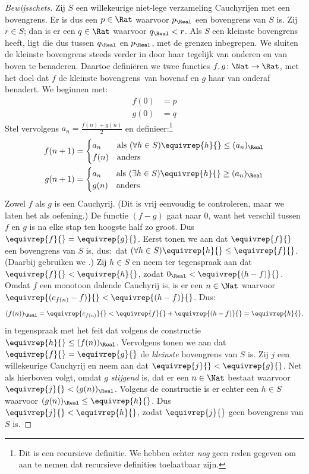 \documentclass[../../../include/open-logic-section]{subfiles}
\begin{document}
\begin{proof}[Bewijsschets] Zij $S$ een willekeurige niet-lege
verzameling Cauchyrijen met een bovengrens. Er is dus een $p \in \Rat$
waarvoor $p_{\Real}$ een bovengrens van $S$ is. Zij $r \in S$; dan is er
een $q \in \Rat$ waarvoor $q_{\Real} < r$. Als $S$ een kleinste
bovengrens heeft, ligt die dus tussen $q_\Real$ en $p_\Real$, met de
grenzen inbegrepen.
We sluiten de kleinste bovengrens steeds verder in door haar tegelijk
van onderen en van boven te benaderen. Daartoe definiëren we twee
functies $f, g \colon \Nat \to \Rat$, met het doel dat $f$ de kleinste
bovengrens\ van bovenaf en $g$ haar van onderaf benadert. We beginnen
met:
\begin{align*}
	f(0) &= p \\
	g(0) &= q
\end{align*}
Stel vervolgens $a_n = \frac{f(n) + g(n)}{2}$ en
definieer:\footnote{Dit is een recursieve definitie. We hebben echter
\emph{nog} geen reden gegeven om aan te nemen dat recursieve definities
toelaatbaar zijn.}
\begin{align*}
	f(n+1) &=
	\begin{cases}
		a_n &\text{als }(\forall h \in S)\equivrep{h}{} \leq (a_n)_\Real\\
		f(n)&\text{anders}
	\end{cases}\\
	g(n+1) &=
	\begin{cases}
		a_n &\text{als }(\exists h \in S)\equivrep{h}{} \geq (a_n)_\Real\\
	 	g(n) &\text{anders}
	\end{cases}
\end{align*}
Zowel $f$ als $g$ is een Cauchyrij. (Dit is vrij eenvoudig te
controleren, maar we laten het als oefening.) De functie $(f-g)$ gaat
naar $0$, want het verschil tussen $f$ en $g$ is na elke stap ten
hoogste half zo groot. Dus $\equivrep{f}{} = \equivrep{g}{}$.
Eerst tonen we aan dat $\equivrep{f}{}$ een bovengrens van $S$ is,
dus:\ dat $(\forall h \in S)\equivrep{h}{} \leq \equivrep{f}{}$. (Daarbij
gebruiken we .) Zij $h \in S$ en neem ter
tegenspraak aan dat $\equivrep{f}{} < \equivrep{h}{}$, zodat $0_\Real <
\equivrep{(h-f)}{}$. Omdat $f$ een monotoon dalende Cauchyrij is, is er
een $n \in \Nat$ waarvoor $\equivrep{(c_{f(n)} - f)}{} <
\equivrep{(h-f)}{}$. Dus:
\[
	(f(n))_\Real = \equivrep{c_{f(n)}}{} < \equivrep{f}{} + \equivrep{(h-f)}{} = \equivrep{h}{},
\]
in tegenspraak met het feit dat volgens de constructie
$\equivrep{h}{} \leq (f(n))_\Real$.
Vervolgens tonen we aan dat $\equivrep{f}{} = \equivrep{g}{}$ de
\emph{kleinste} bovengrens van $S$ is. Zij $j$ een willekeurige
Cauchyrij en neem aan dat $\equivrep{j}{} < \equivrep{g}{}$. Net als
hierboven volgt, omdat $g$ \emph{stijgend} is, dat er een $n \in \Nat$
bestaat waarvoor $\equivrep{j}{} < (g(n))_\Real$. Volgens de constructie
is er echter een $h \in S$ waarvoor $(g(n))_\Real \leq
\equivrep{h}{}$. Dus $\equivrep{j}{} < \equivrep{h}{}$, zodat
$\equivrep{j}{}$ geen bovengrens van $S$ is.
\end{proof}
\end{document}
